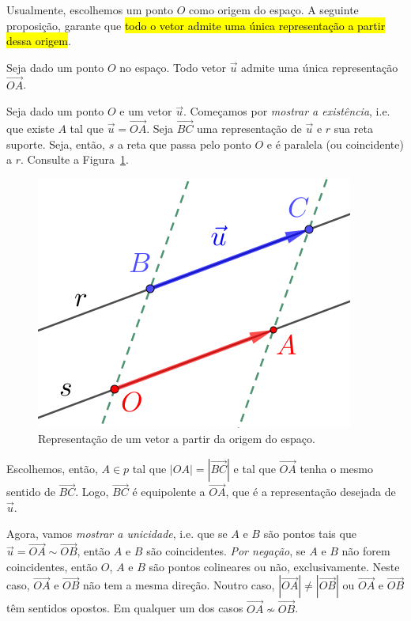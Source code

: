 Usualmente, escolhemos um ponto $O$ como origem do espaço. A seguinte proposição, garante que \hl{todo o vetor admite uma única representação a partir dessa origem}.

\begin{proposicao}\label{cap_vetor_sec_vetor:prop:vetor_origem}
  Seja dado um ponto $O$ no espaço. Todo vetor $\vec{u}$ admite uma única representação $\overrightarrow{OA}$.
\end{proposicao}
\begin{demonstracao}
  Seja dado um ponto $O$ e um vetor $\vec{u}$. Começamos por \emph{mostrar a existência}, i.e. que existe $A$ tal que $\vec{u}=\overrightarrow{OA}$. Seja $\overrightarrow{BC}$ uma representação de $\vec{u}$ e $r$ sua reta suporte. Seja, então, $s$ a reta que passa pelo ponto $O$ e é paralela (ou coincidente) a $r$.  Consulte a Figura~\ref{cap_vetor_sec_vetor:fig:vetor_origem}.
  
  \begin{figure}[h!]
    \centering
    \includegraphics{./cap_vetor/dados/fig_vetor_origem/fig.png}
    \caption{Representação de um vetor a partir da origem do espaço.}
    \label{cap_vetor_sec_vetor:fig:vetor_origem}
  \end{figure}
  
  Escolhemos, então, $A\in p$ tal que $|OA| = \left|\overrightarrow{BC}\right|$ e tal que $\overrightarrow{OA}$ tenha o mesmo sentido de $\overrightarrow{BC}$. Logo, $\overrightarrow{BC}$ é equipolente a $\overrightarrow{OA}$, que é a representação desejada de $\vec{u}$.

  Agora, vamos \emph{mostrar a unicidade}, i.e. que se $A$ e $B$ são pontos tais que $\vec{u}=\overrightarrow{OA}\sim\overrightarrow{OB}$, então $A$ e $B$ são coincidentes. \emph{Por negação}, se $A$ e $B$ não forem coincidentes, então $O$, $A$ e $B$ são pontos colineares ou não, exclusivamente. Neste caso, $\overrightarrow{OA}$ e $\overrightarrow{OB}$ não tem a mesma direção. Noutro caso, $|\overrightarrow{OA}| \neq |\overrightarrow{OB}|$ ou $\overrightarrow{OA}$ e $\overrightarrow{OB}$ têm sentidos opostos. Em qualquer um dos casos $\overrightarrow{OA}\not\sim\overrightarrow{OB}$.
\end{demonstracao}

